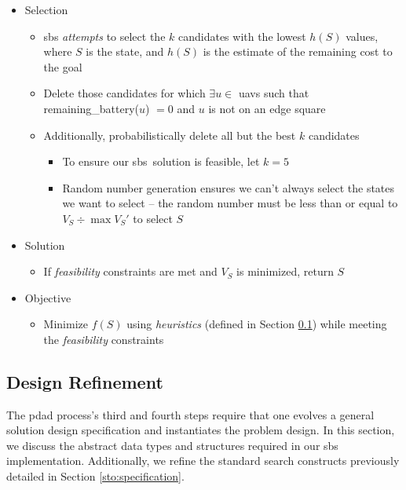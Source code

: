 \documentclass[../main.tex]{subfiles}
\begin{document}
\begin{itemize}
    \item Selection
    \begin{itemize}
        \item \ac{sbs} \textit{attempts} to select the $k$ candidates with the lowest $h(S)$ values, where $S$ is the state, and $h(S)$ is the estimate of the remaining cost to the goal
        \item Delete those candidates for which $\exists u\in$ \acp{uav} such that remaining\_battery($u$) $=0$ and $u$ is not on an edge square
        \item Additionally, probabilistically delete all but the best $k$ candidates
        \begin{itemize}
            \item To ensure our \ac{sbs}\ \probs solution is feasible, let $k=5$
            \item Random number generation ensures we can't always select the states we want to select -- the random number must be less than or equal to $V_S\div \max V_S'$ to select $S$
        \end{itemize} 
    \end{itemize}

    \item Solution
    \begin{itemize}
        \item If \textit{feasibility} constraints are met and $V_S$ is minimized, return $S$
    \end{itemize}

    \item Objective
    \begin{itemize}
        \item Minimize $f(S)$ using \textit{heuristics} (defined in Section \ref{sto:refinement}) while meeting the \textit{feasibility} constraints
    \end{itemize}
\end{itemize}

\subsection{Design Refinement}\label{sto:refinement}

The \ac{pdad} process's third and fourth steps require that one evolves a general solution design specification and instantiates the problem design. In this section, we discuss the abstract data types and structures required in our \ac{sbs} implementation. Additionally, we refine the standard search constructs previously detailed in Section \ref{sto:specification}.
\end{document}
